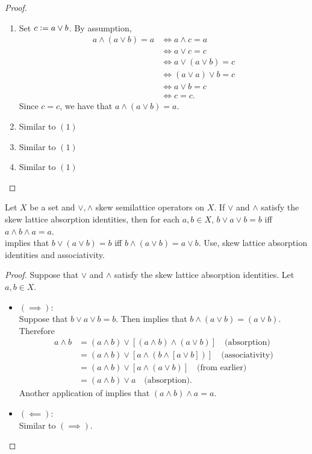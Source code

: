 \documentclass{book}
\begin{document}
\begin{proof}
\begin{itemize}
\begin{enumerate}
				\item Set $c \vcentcolon= a \vee b$. By assumption, 
				\begin{align*}
					a \wedge (a \vee b) = a
					& \iff a \wedge c = a \\
					& \iff a \vee c = c \\
					& \iff a \vee (a \vee b) = c \\
					& \iff (a \vee a) \vee b = c \\
					& \iff a \vee b = c \\
					& \iff c = c.
				\end{align*}
				Since $c =c$, we have that $a \wedge (a \vee b) = a$.
				\item Similar to $(1)$
				\item Similar to $(1)$
				\item Similar to $(1)$
			\end{enumerate}
		\end{itemize}
	\end{proof}
	
	\begin{ex} 
		Let $X$ be a set and $\vee, \wedge$ skew semilattice operators on $X$. If $\vee$ and $\wedge$ satisfy the skew lattice absorption identities, then for each $a,b \in X$, $b \vee a \vee b = b$ iff $a \wedge b \wedge a = a$. \\
		  implies that $b \vee (a \vee b) = b$ iff $b \wedge (a \vee b) = a \vee b$. Use, skew lattice absorption identities and associativity.
	\end{ex}
	
	\begin{proof}
		Suppose that $\vee$ and $\wedge$ satisfy the skew lattice absorption identities. Let $a, b \in X$.  
		\begin{itemize}
			\item $(\implies)$: \\
			Suppose that $b \vee a \vee b = b$. Then  implies that $b \wedge (a \vee b) = (a \vee b)$.
			Therefore
			\begin{align*}
				a \wedge b
				& = (a \wedge b) \vee [(a \wedge b) \wedge (a \vee b)] \quad \text{(absorption)} \\
				& = (a \wedge b) \vee [a \wedge (b \wedge [a \vee b])] \quad \text{(associativity)} \\
				& = (a \wedge b) \vee [a \wedge (a \vee b)] \quad \text{(from earlier)} \\
				& = (a \wedge b) \vee a \quad \text{(absorption)}.
			\end{align*}
			Another application of  implies that $(a \wedge b) \wedge a = a$.
			\item $(\impliedby)$: \\
			Similar to $(\implies)$.
		\end{itemize}
	\end{proof}
	
\end{document}
